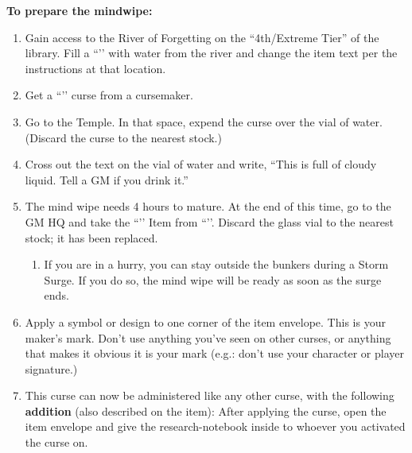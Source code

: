 \documentclass[green]{GL2020}
\begin{document}
\textbf{To prepare the mindwipe:}
\begin{enumerate}
  \item Gain access to the River of Forgetting on the ``4th/Extreme Tier'' of the library. Fill a ``\iGlassVial{}’’ with water from the river and change the item text per the instructions at that location.
  \item Get a ``\iWeakness{}’’ curse from a cursemaker.
  \item Go to the Temple. In that space, expend the curse over the vial of water. (Discard the curse to the nearest stock.)
  \item Cross out the text on the vial of water and write,  “This is full of cloudy liquid. Tell a GM if you drink it.”
  \item The mind wipe needs 4 hours to mature. At the end of this time, go to the GM HQ and take the ``\iMindWipeCurse{}’’ Item from ``\sSignN{}’’. Discard the glass vial to the nearest stock; it has been replaced.
  \begin{enumerate}
    \item If you are in a hurry, you can stay outside the bunkers during a Storm Surge. If you do so, the mind wipe will be ready as soon as the surge ends.
  \end{enumerate}
  \item Apply a symbol or design to one corner of the item envelope. This is your maker’s mark. Don’t use anything you’ve seen on other curses, or anything that makes it obvious it is your mark (e.g.: don’t use your character or player signature.)
  \item This curse can now be administered like any other curse, with the following \textbf{addition} (also described on the item): After applying the curse, open the item envelope and give the research-notebook inside to whoever you activated the curse on.
\end{enumerate}
\end{document}

